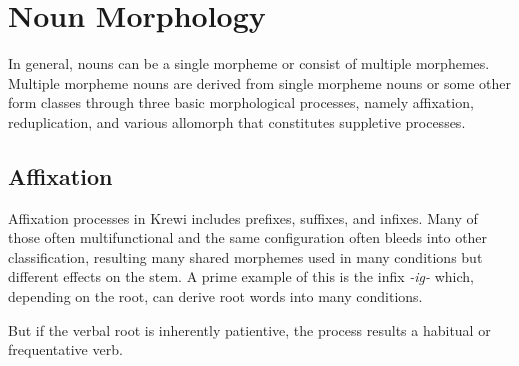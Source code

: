 \section{Noun Morphology}%
In general, nouns can be a single morpheme or consist of multiple morphemes. Multiple morpheme nouns are derived from single morpheme nouns or some other form classes through three basic morphological processes, namely affixation, reduplication, and various allomorph that constitutes suppletive processes.

\subsection{Affixation}%
Affixation processes in Krewi includes prefixes, suffixes, and infixes. Many of those often multifunctional and the same configuration often bleeds into other classification, resulting many shared morphemes used in many conditions but different effects on the stem. A prime example of this is the infix \emph{-ig-} which, depending on the root, can derive root words into many conditions.

\pex
\a {}
\a {}
\xe


But if the verbal root is inherently patientive, the process results a habitual or frequentative verb. \todo

\ex{}\xe



